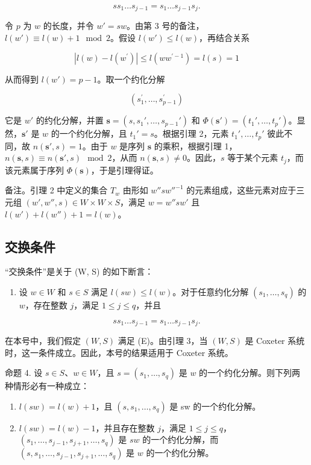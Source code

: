 \[
s s _ {1} \dots s _ {j - 1} = s _ {1} \dots s _ {j - 1} s _ {j}.
\]

令 \(p\) 为 \(w\) 的长度，并令 \(w' = sw\)。由第 3 号的备注，\(l(w') \equiv l(w) + 1 \mod 2\)。假设 \(l(w') \leqslant l(w)\)，再结合关系

\[
| l (w) - l (w ^ {\prime}) | \leqslant l (w w ^ {\prime - 1}) = l (s) = 1
\]

从而得到 \(l(w') = p - 1\)。取一个约化分解

\[
\left(s _ {1} ^ {\prime}, \ldots , s _ {p - 1} ^ {\prime}\right)
\]

它是 \(w'\) 的约化分解，并置 \(\mathbf{s} = (s, s_1', \ldots, s_{p-1}')\) 和 \(\Phi(\mathbf{s}') = (t_1', \ldots, t_p')\)。显然，\(\mathbf{s}'\) 是 \(w\) 的一个约化分解，且 \(t_1' = s\)。根据引理 2，元素 \(t_1', \ldots, t_p'\) 彼此不同，故 \(n(\mathbf{s}', s) = 1\)。由于 \(w\) 是序列 \(\mathbf{s}\) 的乘积，根据引理 1，\(n(\mathbf{s}, s) \equiv n(\mathbf{s}', s) \mod 2\)，从而 \(n(\mathbf{s}, s) \neq 0\)。因此，\(s\) 等于某个元素 \(t_j\)，而该元素属于序列 \(\Phi(\mathbf{s})\)，于是引理得证。

备注。引理 2 中定义的集合 \(T_{w}\) 由形如 \(w''sw''^{-1}\) 的元素组成，这些元素对应于三元组 \((w', w'', s) \in W \times W \times S\)，满足 \(w = w''sw'\) 且 \(l(w') + l(w'') + 1 = l(w)\)。

\subsection{交换条件}

``交换条件''是关于 (W, S) 的如下断言：

\begin{enumerate}
\def\labelenumi{(\Alph{enumi})}
\setcounter{enumi}{4}
\tightlist
\item
  设 \(w \in W\) 和 \(s \in S\) 满足 \(l(sw) \leqslant l(w)\)。对于任意约化分解 \((s_1, \ldots, s_q)\) 的 \(w\)，存在整数 \(j\)，满足 \(1 \leqslant j \leqslant q\)，并且
\end{enumerate}

\[
s s _ {1} \dots s _ {j - 1} = s _ {1} \dots s _ {j - 1} s _ {j}.\tag{16}
\]

在本号中，我们假定 \((W,S)\) 满足 (E)。由引理 3，当 \((W,S)\) 是 Coxeter 系统时，这一条件成立。因此，本号的结果适用于 Coxeter 系统。

命题 4. 设 \(s \in S\)、\(w \in W\)，且 \(s = (s_1, \ldots, s_q)\) 是 \(w\) 的一个约化分解。则下列两种情形必有一种成立：

\begin{enumerate}
\def\labelenumi{\alph{enumi})}
\item
  \(l(sw) = l(w) + 1\)，且 \((s, s_1, \ldots, s_q)\) 是 sw 的一个约化分解。
\item
  \(l(sw) = l(w) - 1\)，并且存在整数 \(j\)，满足 \(1 \leqslant j \leqslant q\)，\((s_1, \ldots, s_{j-1}, s_{j+1}, \ldots, s_q)\) 是 \(sw\) 的一个约化分解，而 \((s, s_1, \ldots, s_{j-1}, s_{j+1}, \ldots, s_q)\) 是 \(w\) 的一个约化分解。
\end{enumerate}

